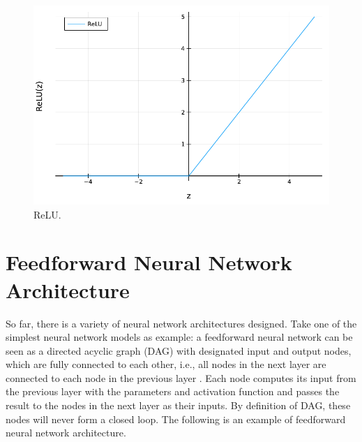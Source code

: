 \documentclass[
	parskip, 			   %
	twoside, 			   %
	DIV=14, 			   %
	BCOR=15.0mm, 		   %
	headsepline, 		   %
	open=right, 		   %
	captions=tableheading, %
	bibliography=totoc,    %
	numbers=noenddot       %
]{scrreprt}
\begin{document}
\begin{figure}[h!]
    \centering
    \includegraphics[scale=0.6]{figures/ReLU.pdf}
    \caption{ReLU.}
    \label{fig:ReLU}
\end{figure}


\section{Feedforward Neural Network Architecture}
So far, there is a variety of neural network architectures designed. Take one of the simplest neural network models as example: a feedforward neural network can be seen as a directed acyclic graph (DAG) with designated input and output nodes, which are fully connected to each other, i.e., all nodes in the next layer are connected to each node in the previous layer \cite{russell2010artificial}. Each node computes its input from the previous layer with the parameters and activation function and passes the result to the nodes in the next layer as their inputs. By definition of DAG, these nodes will never form a closed loop. The following is an example of feedforward neural network architecture.
\end{document}

